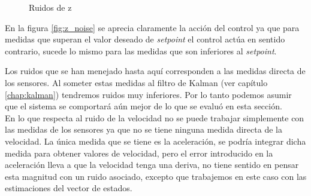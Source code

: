 \documentclass[main]{subfiles}
\begin{document}
\begin{figure}
  \centering
  \caption{Ruidos de z}
  \label{fig:ruidos_z}
\end{figure}

En la figura \ref{fig:z_noise} se aprecia claramente la acci\'on del control ya que para medidas que superan el valor deseado de \emph{setpoint} el control act\'ua en sentido contrario, sucede lo mismo para las medidas que son inferiores al \emph{setpoint}.

Los ruidos que se han menejado hasta aqu\'i corresponden a las medidas directa de los sensores. Al someter estas medidas al filtro de Kalman (ver cap\'itulo \ref{chap:kalman}) tendremos ruidos muy inferiores. Por lo tanto podemos asumir que el sistema se comportar\'a a\'un mejor de lo que se evalu\'o en esta secci\'on.\\

En lo que respecta al ruido de la velocidad no se puede trabajar simplemente con las medidas de los sensores ya que no se tiene ninguna medida directa de la velocidad. La \'unica medida que se tiene es la aceleraci\'on, se podr\'ia integrar dicha medida para obtener valores de velocidad, pero el error introducido en la aceleraci\'on lleva a que la velocidad tenga una deriva, no tiene sentido en pensar esta magnitud con un ruido asociado, excepto que trabajemos en este caso con las estimaciones del vector de estados.\\ 
\end{document}

